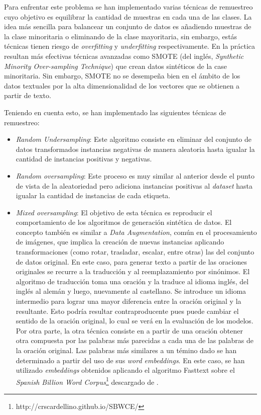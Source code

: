 Para enfrentar este problema se han implementado varias técnicas de remuestreo cuyo objetivo es equilibrar la cantidad de muestras en cada una de las clases. La idea más sencilla para balancear un conjunto de datos es añadiendo muestras de la clase minoritaria o eliminando de la clase mayoritaria, sin embargo, estás técnicas tienen riesgo de \textit{overfitting} y \textit{underfitting} respectivamente. En la práctica resultan más efectivas técnicas avanzadas como SMOTE (del inglés, \textit{Synthetic Minority Over-sampling Technique}) que crean datos sintéticos de la case minoritaria. Sin embargo, SMOTE no se desempeña bien en el ámbito de los datos textuales por la alta dimensionalidad de los vectores que se obtienen a partir de texto.

Teniendo en cuenta esto, se han implementado las siguientes técnicas de remuestreo:

\begin{itemize}
  \item \textit{Random Undersampling}: Este algoritmo consiste en eliminar del conjunto de datos transformados instancias negativas de manera aleatoria hasta igualar la cantidad de instancias positivas y negativas.
  \item \textit{Random oversampling}: Este proceso es muy similar al anterior desde el punto de vista de la aleatoriedad pero adiciona instancias positivas al \textit{dataset} hasta igualar la cantidad de instancias de cada etiqueta.
  \item \textit{Mixed oversampling}: El objetivo de esta técnica es reproducir el comportamiento de los algoritmos de generación sintética de datos. El concepto también es similar a \textit{Data Augmentation}, común en el procesamiento de imágenes, que implica la creación de nuevas instancias aplicando transformaciones (como rotar, trasladar, escalar, entre otras) las del conjunto de datos original. En este caso, para generar texto a partir de las oraciones originales se recurre a la traducción y al reemplazamiento por sinónimos. El algoritmo de traducción toma una oración y la traduce al idioma inglés, del inglés al alemán y luego, nuevamente al castellano. Se introduce un idioma intermedio para lograr una mayor diferencia entre la oración original y la resultante. Esto podría resultar contraproducente pues puede cambiar el sentido de la oración original, lo cual se verá en la evaluación de los modelos. Por otra parte, la otra técnica consiste en a partir de una oración obtener otra compuesta por las palabras más parecidas a cada una de las palabras de la oración original. Las palabras más similares a un témino dado se han determinado a partir del uso de sus \textit{word embeddings}. En este caso, se han utilizado \textit{embeddings} obtenidos aplicando el algoritmo Fasttext sobre el \textit{Spanish Billion Word Corpus}\footnote{http://crscardellino.github.io/SBWCE/} descargado de \cite{spanish-word-embeddings}. 
\end{itemize}

